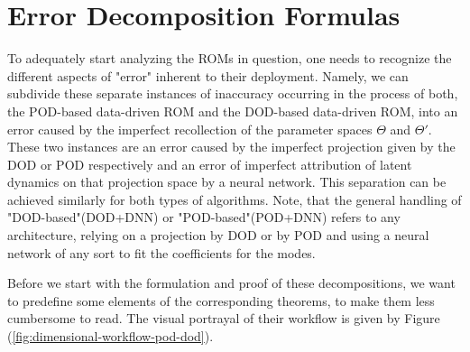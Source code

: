 \section{Error Decomposition Formulas} \label{section: error decomposition}




To adequately start analyzing the ROMs in question, one needs to recognize the different aspects of "error" 
inherent to their deployment. Namely, we can subdivide these separate instances of inaccuracy occurring in the process
of both, the POD-based data-driven ROM and the DOD-based data-driven ROM, into an error caused by the imperfect
recollection of the parameter spaces $\Theta$ and $\Theta'$. These two instances are an error caused by the imperfect 
projection given by the DOD or POD respectively and an error of imperfect attribution of latent dynamics
on that projection space by a neural network. This separation can be achieved similarly for both types of algorithms.
Note, that the general handling of "DOD-based"(DOD+DNN) or "POD-based"(POD+DNN) refers to any architecture, relying
on a projection by DOD or by POD and using a neural network of any sort to fit the coefficients for the modes.

Before we start with the formulation and proof of these decompositions, we want to predefine some elements of the
corresponding theorems, to make them less cumbersome to read. The visual portrayal of their workflow
is given by Figure (\ref{fig:dimensional-workflow-pod-dod}).

